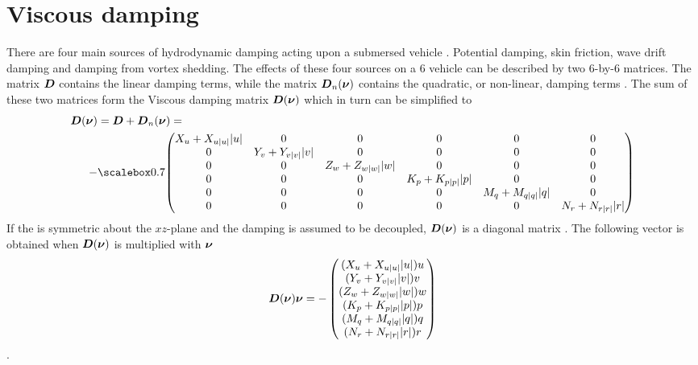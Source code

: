 \section{Viscous damping}
There are four main sources of hydrodynamic damping acting upon a submersed vehicle \citep[p.122]{fossen2011}.
Potential damping, skin friction, wave drift damping and damping from vortex shedding. The effects of these four sources on a 6 \abbrDOF vehicle can be described by two 6-by-6 matrices.
The matrix $\boldsymbol{D}$ contains the linear damping terms, while the matrix $\boldsymbol{D}_{n}(\boldsymbol{\nu})$ contains the quadratic, or non-linear, damping terms \citep{fossen2011}. The sum of these two matrices form the Viscous damping matrix $\boldsymbol{D}(\boldsymbol{\nu})$ which in turn can be simplified to
\begin{equation}
\begin{split}
    \damping(\nuVector) &= \damping + \damping_{n}(\nuVector) = \\
    -& \scalemath{0.7}{\begin{pmatrix}
        \Xu+\Xuabsu\abs{u} & 0 & 0 & 0 & 0 & 0 \\
        0 & \Yv+\Yvabsv\abs{v} & 0 & 0 & 0 & 0 \\
        0 & 0 & \Zw+\Zwabsw\abs{w} & 0 & 0 & 0 \\
        0 & 0 & 0 & \Kp+\Kpabsp\abs{p} & 0 & 0 \\
        0 & 0 & 0 & 0 & \Mq+\Mqabsq\abs{q} & 0 \\
        0 & 0 & 0 & 0 & 0 & \Nr+\Nrabsr\abs{r} \\
    \end{pmatrix}}
\end{split}
\end{equation}
If the \abbrROV is symmetric about the $xz$-plane and the damping is assumed to be decoupled, $\boldsymbol{D}(\boldsymbol{\nu})$ is a diagonal matrix \citep[p.129-130]{fossen2011}. The following vector is obtained when $\boldsymbol{D}(\boldsymbol{\nu})$ is multiplied with $\boldsymbol{\nu}$
\begin{equation}
    \boldsymbol{D}(\boldsymbol{\nu}) \boldsymbol{\nu} =
     -\begin{pmatrix}
    (X_{u} + X_{u|u|} |u|) u\\
    (Y_{v} + Y_{v|v|} |v|) v\\
    (Z_{w} + Z_{w|w|} |w|) w\\
    (K_{p} + K_{p|p|} |p|) p\\
    (M_{q} + M_{q|q|} |q|) q\\
    (N_{r} + N_{r|r|} |r|) r\\
    \end{pmatrix}    
\end{equation}.



